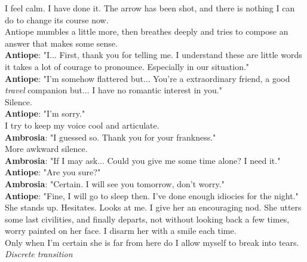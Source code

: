 \documentclass{report}
\newcommand{\dcomment}[1]{
	\emph{#1}
	\\
}
\newcommand{\speaker}[1]{
	\textbf{#1}: 
}
\begin{document}
I feel calm. I have done it. The arrow has been shot, and there is nothing I can do to change its course now.\\

Antiope mumbles a little more, then breathes deeply and tries to compose an answer that makes some sense.\\

\speaker{Antiope} "I... First, thank you for telling me. I understand these are little words it takes a lot of courage to pronounce. Especially in our situation."\\

\speaker{Antiope} "I'm somehow flattered but... You're a extraordinary friend, a good \emph{travel} companion but... I have no romantic interest in you."\\

Silence.\\

\speaker{Antiope} "I'm sorry."\\

I try to keep my voice cool and articulate.\\

\speaker{Ambrosia} "I guessed so. Thank you for your frankness."\\

More awkward silence.\\

\speaker{Ambrosia} "If I may ask... Could you give me some time alone? I need it."\\

\speaker{Antiope} "Are you sure?"\\

\speaker{Ambrosia} "Certain. I will see you tomorrow, don't worry."\\

\speaker{Antiope} "Fine, I will go to sleep then. I've done enough idiocies for the night."\\

She stands up. Hesitates. Looks at me. I give her an encouraging nod. She utters some last civilities, and finally departs, not without looking back a few times, worry painted on her face. I disarm her with a smile each time.\\

Only when I'm certain she is far from here do I allow myself to break into tears.\\

\dcomment{
	Discrete transition
}
\end{document}

